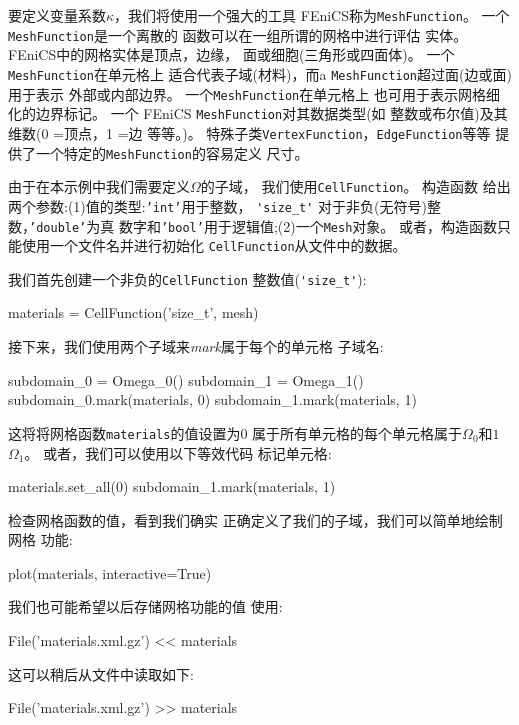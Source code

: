 要定义变量系数$\kappa$，我们将使用一个强大的工具
FEniCS称为\texttt{MeshFunction}。 一个\texttt{MeshFunction}是一个离散的
函数可以在一组所谓的网格中进行评估
实体。 FEniCS中的网格实体是顶点，边缘，
面或细胞(三角形或四面体)。 一个\texttt{MeshFunction}在单元格上
适合代表子域(材料)，而a
\texttt{MeshFunction}超过面(边或面)用于表示
外部或内部边界。 一个\texttt{MeshFunction}在单元格上
也可用于表示网格细化的边界标记。 一个
FEniCS \texttt{MeshFunction}对其数据类型(如
整数或布尔值)及其维数(0 =顶点，1 =边
等等。)。 特殊子类\texttt{VertexFunction}，\texttt{EdgeFunction}等等
提供了一个特定的\texttt{MeshFunction}的容易定义
尺寸。

由于在本示例中我们需要定义$\Omega$的子域，
我们使用\texttt{CellFunction}。 构造函数
给出两个参数:(1)值的类型:\texttt{'int'}用于整数，
\verb!'size_t'! 对于非负(无符号)整数，\texttt{'double'}为真
数字和\texttt{'bool'}用于逻辑值;(2)一个\texttt{Mesh}对象。
或者，构造函数只能使用一个文件名并进行初始化
\texttt{CellFunction}从文件中的数据。

我们首先创建一个非负的\texttt{CellFunction}
整数值(\verb!'size_t'!):

\begin{python}
materials = CellFunction('size_t', mesh)
\end{python}

接下来，我们使用两个子域来\emph{mark}属于每个的单元格
子域名:
\begin{python}
subdomain_0 = Omega_0()
subdomain_1 = Omega_1()
subdomain_0.mark(materials, 0)
subdomain_1.mark(materials, 1)
\end{python}

这将将网格函数\texttt{materials}的值设置为$0$
属于所有单元格的每个单元格属于$\Omega_0$和$1$
$\Omega_1$。 或者，我们可以使用以下等效代码
标记单元格:

\begin{python}
materials.set_all(0)
subdomain_1.mark(materials, 1)
\end{python}
检查网格函数的值，看到我们确实
正确定义了我们的子域，我们可以简单地绘制网格
功能:

\begin{python}
plot(materials, interactive=True)
\end{python}
我们也可能希望以后存储网格功能的值
使用:
\begin{python}
File('materials.xml.gz') << materials
\end{python}
这可以稍后从文件中读取如下:
\begin{python}
File('materials.xml.gz') >> materials
\end{python}

